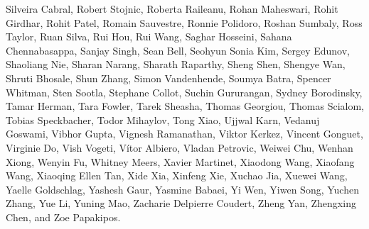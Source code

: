 \documentclass[dvipsnames]{fairmeta}
\begin{document}
Silveira Cabral, Robert Stojnic, Roberta Raileanu, Rohan Maheswari, Rohit Girdhar, Rohit Patel, Romain Sauvestre, Ronnie Polidoro, Roshan Sumbaly, Ross Taylor, Ruan Silva, Rui Hou, Rui Wang, Saghar Hosseini, Sahana Chennabasappa, Sanjay Singh, Sean Bell, Seohyun Sonia Kim, Sergey Edunov, Shaoliang Nie, Sharan Narang, Sharath Raparthy, Sheng Shen, Shengye Wan, Shruti Bhosale, Shun Zhang, Simon Vandenhende, Soumya Batra, Spencer Whitman, Sten Sootla, Stephane Collot, Suchin Gururangan, Sydney Borodinsky, Tamar Herman, Tara Fowler, Tarek Sheasha, Thomas Georgiou, Thomas Scialom, Tobias Speckbacher, Todor Mihaylov, Tong Xiao, Ujjwal Karn, Vedanuj Goswami, Vibhor Gupta, Vignesh Ramanathan, Viktor Kerkez, Vincent Gonguet, Virginie Do, Vish Vogeti, Vítor Albiero, Vladan Petrovic, Weiwei Chu, Wenhan Xiong, Wenyin Fu, Whitney Meers, Xavier Martinet, Xiaodong Wang, Xiaofang Wang, Xiaoqing Ellen Tan, Xide Xia, Xinfeng Xie, Xuchao Jia, Xuewei Wang, Yaelle Goldschlag, Yashesh Gaur, Yasmine Babaei, Yi Wen, Yiwen Song, Yuchen Zhang, Yue Li, Yuning Mao, Zacharie Delpierre Coudert, Zheng Yan, Zhengxing Chen, and Zoe Papakipos.
\end{document}
